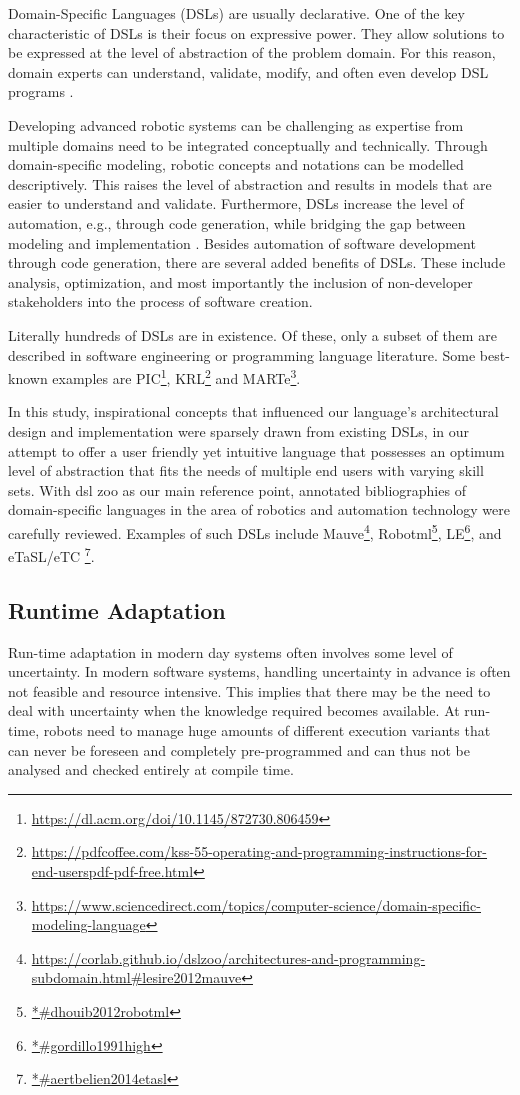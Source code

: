 \documentclass[conference]{IEEEtran}
\newcommand{\foot}[1]{\footnote{\url{#1}}}
\begin{document}
Domain-Specific Languages (DSLs) are usually declarative. One of the key characteristic of DSLs is their focus on expressive power. They allow solutions to be expressed at the level of abstraction of the problem domain. For this reason, domain experts can understand, validate, modify, and often even develop DSL programs \cite{dsl}.

Developing advanced robotic systems can be challenging as expertise from multiple domains need to be integrated conceptually and technically. Through domain-speciﬁc modeling, robotic concepts and notations can be modelled descriptively. This raises the level of abstraction and results in models that are easier to understand and validate. Furthermore, DSLs increase the level of automation, e.g., through code generation, while bridging the gap between modeling and implementation \cite{dsl-robo}. Besides automation of software development through code generation, there are several added benefits of DSLs. These include analysis, optimization, and most importantly the inclusion of non-developer stakeholders into the process of software creation.

Literally hundreds of DSLs are in existence. Of these, only a subset of them are described in software engineering or programming language literature. Some best-known examples are PIC\foot{https://dl.acm.org/doi/10.1145/872730.806459}, KRL\foot{https://pdfcoffee.com/kss-55-operating-and-programming-instructions-for-end-userspdf-pdf-free.html} and MARTe\foot{https://www.sciencedirect.com/topics/computer-science/domain-specific-modeling-language}.

In this study, inspirational concepts that influenced our language's architectural design and implementation were sparsely drawn from existing DSLs, in our attempt to offer a user friendly yet intuitive language that possesses an optimum level of abstraction that fits the needs of multiple end users with varying skill sets. With dsl zoo \cite{dsl-robo} as our main reference point, annotated bibliographies of domain-specific languages in the area of robotics and automation technology were carefully reviewed. Examples of such DSLs include Mauve\foot{https://corlab.github.io/dslzoo/architectures-and-programming-subdomain.html#lesire2012mauve}, Robotml\foot{*#dhouib2012robotml}, LE\foot{*#gordillo1991high}, and eTaSL/eTC \foot{*#aertbelien2014etasl}.

\subsection{Runtime Adaptation}
Run-time adaptation in modern day systems often involves some level of uncertainty. In modern software systems, handling uncertainty in advance is often not feasible and resource intensive. This implies that there may be the need to deal with uncertainty when the knowledge required becomes available. At run-time, robots need to manage huge amounts of different execution variants that can never be foreseen and completely pre-programmed and can thus not be analysed and checked entirely at compile time.
\end{document}
